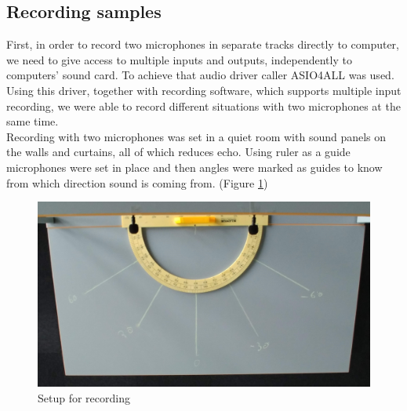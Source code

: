 \subsection{Recording samples}
First, in order to record two microphones in separate tracks directly to computer, we need to give access to 
multiple inputs and outputs,  
independently to computers' sound card. To achieve that audio driver caller ASIO4ALL was used. Using this 
driver, together with recording software, 
which supports multiple input recording, we were able to record different situations with two microphones at 
the same time. \\
Recording with two microphones was set in a quiet room with sound panels on the walls and curtains, all of 
which reduces echo. Using ruler as a guide microphones were set in place and then angles were marked as 
guides to know from which direction sound is coming from. (Figure \ref{fig:recSetup}) 
\begin{figure}[htp]
	\centering
	\includegraphics[width=1\textwidth]{Illustrations/JustSetup.jpg}
	\caption{Setup for recording}
	\label{fig:recSetup}
\end{figure}

 

